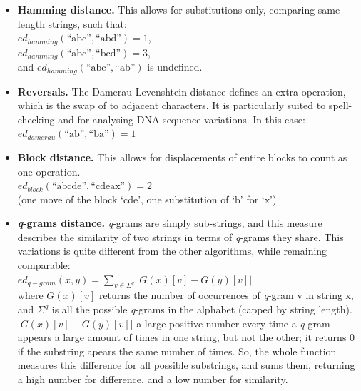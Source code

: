 \documentclass[a4paper,11pt,twoside,notitlepage]{article}
\begin{document}
        \begin{itemize}
          \item \textbf{Hamming distance.} This allows for
            substitutions only, comparing same-length strings, such
            that:\\ 
            $ed_{hamming}(\text{``abc''},\text{``abd''}) =1$,\\ 
            $ed_{hamming}(\text{``abc''},\text{``bcd''}) = 3$,\\ 
            and $ed_{hamming}(\text{``abc''},\text{``ab''})$ is
            undefined.\cite{Hamming1950}
          \item \textbf{Reversals.} The Damerau-Levenshtein distance
            defines an extra operation, which is the swap of to
            adjacent characters. It is particularly suited to spell-checking
            and for analysing DNA-sequence variations. In this case:\\ 
            $ed_{damerau}(\text{``ab''},\text{``ba''}) = 1$
          \item \textbf{Block distance.} This allows for displacements
            of entire blocks to count as one
            operation.\\
            $ed_{block}(\text{``abcde''},\text{``cdeax''})= 2$ \\
            (one move of the block `cde', one substitution of `b'
            for `x')\cite{Tichy1984}
          \item \textbf{\textit{q}-grams distance.} \textit{q}-grams
            are simply sub-strings, and this measure describes the
            similarity of two strings in terms of \textit{q}-grams
            they share.\cite{Ukkonen1992} This variations is quite
            different from the other algorithms, while remaining
            comparable:\\
            $ed_{q-gram}(x,y)=\sum\limits_{v\in\Sigma ^q}|G(x)[v]-G(y)[v]|$\\ 
            where $G(x)[v]$ returns the number of occurrences of
            \textit{q}-gram v in string x, and $\Sigma ^q$ is all the
            possible \textit{q}-grams in the
            alphabet (capped by string length). $|G(x)[v]-G(y)[v]|$ a
            large positive number every time a \textit{q}-gram appears
            a large amount of times in one string, but not the other;
            it returns 0 if the substring apears the same number of
            times. So, the whole function measures this difference for
            all possible substrings, and sums them, returning a high
            number for difference, and a low number for similarity.
        \end{itemize}
\end{document}
